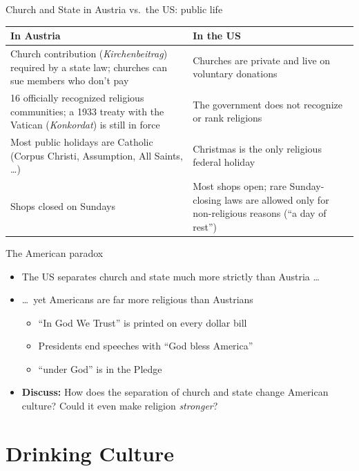 \documentclass[aspectratio=169,11pt]{beamer}
\begin{document}
\begin{frame}{Church and State in Austria vs.\ the US: public life}
  \small
  \renewcommand{\arraystretch}{1.15}
  \begin{tabular}{@{}p{}p{}@{}}
    \toprule
    \textbf{\color{austria}In Austria} & \textbf{\color{oldblue}In the US} \\
    \midrule
    Church contribution (\emph{Kirchenbeitrag}) required by a state law; churches can sue members who don't pay
      & Churches are private and live on voluntary donations \\
    16 officially recognized religious communities; a 1933 treaty with the Vatican (\emph{Konkordat}) is still in force
      & The government does not recognize or rank religions \\
    Most public holidays are Catholic (Corpus Christi, Assumption, All Saints, \ldots)
      & Christmas is the only religious federal holiday \\
    Shops closed on Sundays
      & Most shops open; rare Sunday-closing laws are allowed only for non-religious reasons (``a day of rest'') \\
    \bottomrule
  \end{tabular}
\end{frame}

\begin{frame}{The American paradox}
  \begin{itemize}\setlength{\itemsep}{1em}
    \item The US separates church and state much more strictly than Austria \ldots
    \item \ldots\ yet Americans are \alert{far more religious} than Austrians
      \begin{itemize}
        \item ``In God We Trust'' is printed on every dollar bill
        \item Presidents end speeches with ``God bless America''
        \item ``under God'' is in the Pledge
      \end{itemize}
    \item \textbf{Discuss:} How does the separation of church and state change American culture? Could it even make religion \emph{stronger}?
  \end{itemize}
\end{frame}

\section{Drinking Culture}
\end{document}
